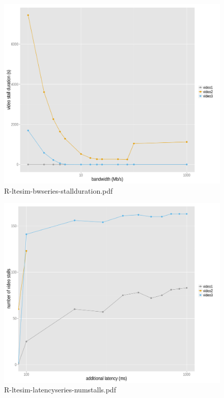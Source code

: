\begin{figure}[htb]
\centering
\includegraphics[width=1.0\textwidth]{images/R-ltesim-bwseries-stallduration.pdf}
\caption{R-ltesim-bwseries-stallduration.pdf}
\label{c5:fig:ltesim-bwseries-stallduration}
\end{figure}

\begin{figure}[htb]
\centering
\includegraphics[width=1.0\textwidth]{images/R-ltesim-latencyseries-numstalls.pdf}
\caption{R-ltesim-latencyseries-numstalls.pdf}
\label{c5:fig:ltesim-latencyseries-numstalls}
\end{figure}


